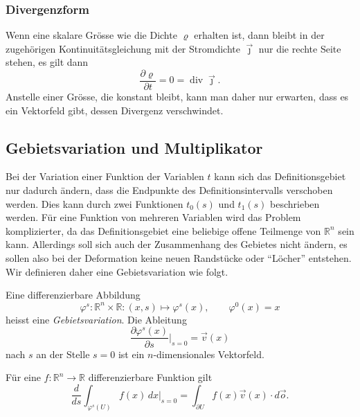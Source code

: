 %
%
\subsubsection{Divergenzform}
Wenn eine skalare Grösse wie die Dichte $\varrho$ erhalten ist, dann bleibt
in der zugehörigen Kontinuitätsgleichung mit der Stromdichte
$\vec{\jmath}$ nur die rechte Seite stehen, es gilt dann
\[
\frac{\partial\varrho}{\partial t}
=
0
=
\operatorname{div} \vec{\jmath}.
\]
Anstelle einer Grösse, die konstant bleibt, kann man daher nur erwarten,
dass es ein Vektorfeld gibt, dessen Divergenz verschwindet.

%
%
\subsection{Gebietsvariation und Multiplikator}
Bei der Variation einer Funktion der Variablen $t$ kann sich das
Definitionsgebiet nur dadurch ändern, dass die Endpunkte des
Definitionsintervalls verschoben werden.
Dies kann durch zwei Funktionen $t_0(s)$ und $t_1(s)$ beschrieben werden.
Für eine Funktion von mehreren Variablen wird das Problem komplizierter,
da das Definitionsgebiet eine beliebige offene Teilmenge von $\mathbb{R}^n$
sein kann.
Allerdings soll sich auch der Zusammenhang des Gebietes nicht ändern,
es sollen also bei der Deformation keine neuen Randstücke oder ``Löcher''
entstehen.
Wir definieren daher eine Gebietsvariation wie folgt.

\begin{definition}
Eine differenzierbare Abbildung
\[
\varphi^s
\colon
\mathbb{R}^n\times \mathbb{R}
:
(x,s)
\mapsto
\varphi^s(x),
\qquad
\varphi^0(x)=x
\]
heisst eine {\em Gebietsvariation}.
%
Die Ableitung
\[
\frac{\partial \varphi^s(x)}{\partial s}\bigg|_{s=0}
=
\vec{v}(x)
\]
nach $s$ an der Stelle $s=0$ ist ein $n$-dimensionales Vektorfeld.
\end{definition}

%

\begin{satz}
\label{buch:symmetrien:felder:satz:gebietsintegral}
Für eine $f\colon \mathbb{R}^n\to\mathbb{R}$ differenzierbare Funktion
gilt
\begin{equation}
\frac{d}{ds}
\int_{\varphi^s(U)}
f(x)\,dx
\bigg|_{s=0}
=
\int_{\partial U} f(x)\vec{v}(x)\cdot d\vec{o}.
\label{buch:symmetrien:felder:eqn:gebietsintegral}
\end{equation}
\end{satz}

